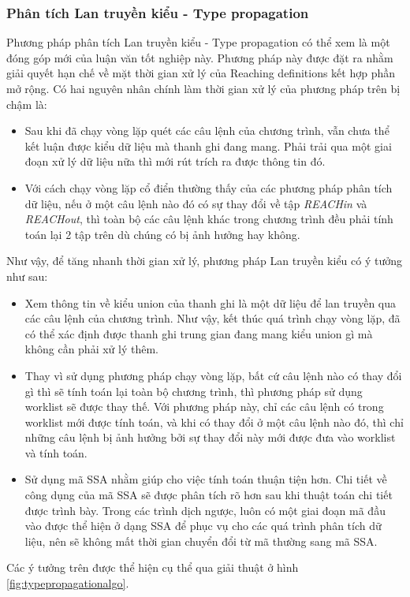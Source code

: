 \subsubsection{Phân tích Lan truyền kiểu - Type propagation}
Phương pháp phân tích Lan truyền kiểu - Type propagation có thể xem là một đóng góp mới của luận văn tốt nghiệp này. Phương pháp này được đặt ra nhằm giải quyết hạn chế về mặt thời gian xử lý của Reaching definitions kết hợp phần mở rộng. Có hai nguyên nhân chính làm thời gian xử lý của phương pháp trên bị chậm là:
\begin{itemize}
	\item Sau khi đã chạy vòng lặp quét các câu lệnh của chương trình, vẫn chưa thể kết luận được kiểu dữ liệu mà thanh ghi đang mang. Phải trải qua một giai đoạn xử lý dữ liệu nữa thì mới rút trích ra được thông tin đó.
	\item Với cách chạy vòng lặp cổ điển thường thấy của các phương pháp phân tích dữ liệu, nếu ở một câu lệnh nào đó có sự thay đổi về tập \textit{REACHin} và \textit{REACHout}, thì toàn bộ các câu lệnh khác trong chương trình đều phải tính toán lại 2 tập trên dù chúng có bị ảnh hưởng hay không.
\end{itemize}
Như vậy, để tăng nhanh thời gian xử lý, phương pháp Lan truyền kiểu có ý tưởng như sau:
\begin{itemize}
	\item Xem thông tin về kiểu union của thanh ghi là một dữ liệu để lan truyền qua các câu lệnh của chương trình. Như vậy, kết thúc quá trình chạy vòng lặp, đã có thể xác định được thanh ghi trung gian đang mang kiểu union gì mà không cần phải xử lý thêm.
	\item Thay vì sử dụng phương pháp chạy vòng lặp, bất cứ câu lệnh nào có thay đổi gì thì sẽ tính toán lại toàn bộ chương trình, thì phương pháp sử dụng worklist sẽ được thay thế. Với phương pháp này, chỉ các câu lệnh có trong worklist mới được tính toán, và khi có thay đổi ở một câu lệnh nào đó, thì chỉ những câu lệnh bị ảnh hưởng bởi sự thay đổi này mới được đưa vào worklist và tính toán.
	\item Sử dụng mã SSA nhằm giúp cho việc tính toán thuận tiện hơn. Chi tiết về công dụng của mã SSA sẽ được phân tích rõ hơn sau khi thuật toán chi tiết được trình bày. Trong các trình dịch ngược, luôn có một giai đoạn mã đầu vào được thể hiện ở dạng SSA để phục vụ cho các quá trình phân tích dữ liệu, nên sẽ không mất thời gian chuyển đổi từ mã thường sang mã SSA.
\end{itemize}
Các ý tưởng trên được thể hiện cụ thể qua giải thuật ở hình \ref{fig:typepropagationalgo}.\\

